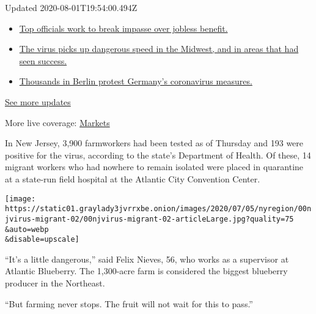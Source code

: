 Updated 2020-08-01T19:54:00.494Z

\begin{itemize}
\tightlist
\item
  \href{https://www.nytimes3xbfgragh.onion/2020/08/01/world/coronavirus-covid-19.html?action=click\&pgtype=Article\&state=default\&region=MAIN_CONTENT_1\&context=storylines_live_updates\#link-3ac56579}{Top
  officials work to break impasse over jobless benefit.}
\item
  \href{https://www.nytimes3xbfgragh.onion/2020/08/01/world/coronavirus-covid-19.html?action=click\&pgtype=Article\&state=default\&region=MAIN_CONTENT_1\&context=storylines_live_updates\#link-8796723}{The
  virus picks up dangerous speed in the Midwest, and in areas that had
  seen success.}
\item
  \href{https://www.nytimes3xbfgragh.onion/2020/08/01/world/coronavirus-covid-19.html?action=click\&pgtype=Article\&state=default\&region=MAIN_CONTENT_1\&context=storylines_live_updates\#link-25930521}{Thousands
  in Berlin protest Germany's coronavirus measures.}
\end{itemize}

\href{https://www.nytimes3xbfgragh.onion/2020/08/01/world/coronavirus-covid-19.html?action=click\&pgtype=Article\&state=default\&region=MAIN_CONTENT_1\&context=storylines_live_updates}{See
more updates}

More live coverage:
\href{https://www.nytimes3xbfgragh.onion/live/2020/07/31/business/stock-market-today-coronavirus?action=click\&pgtype=Article\&state=default\&region=MAIN_CONTENT_1\&context=storylines_live_updates}{Markets}

In New Jersey, 3,900 farmworkers had been tested as of Thursday and 193
were positive for the virus, according to the state's Department of
Health. Of these, 14 migrant workers who had nowhere to remain isolated
were placed in quarantine at a state-run field hospital at the Atlantic
City Convention Center.

\texttt{[image: https://static01.graylady3jvrrxbe.onion/images/2020/07/05/nyregion/00njvirus-migrant-02/00njvirus-migrant-02-articleLarge.jpg?quality=75\\\&auto=webp\\\&disable=upscale]}

``It's a little dangerous,'' said Felix Nieves, 56, who works as a
supervisor at Atlantic Blueberry. The 1,300-acre farm is considered the
biggest blueberry producer in the Northeast.

``But farming never stops. The fruit will not wait for this to pass.''

